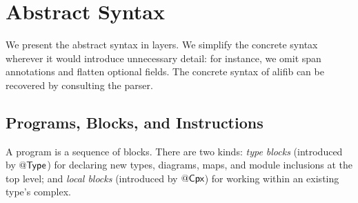 \documentclass[acmsmall,screen,nonacm]{acmart}
\begin{document}
\section{Abstract Syntax}
\label{sec:syntax}

We present the abstract syntax in layers. We simplify the concrete syntax
wherever it would introduce unnecessary detail: for instance, we omit span
annotations and flatten optional fields. The concrete syntax of
\textsf{alifib} can be recovered by consulting the parser.

\subsection{Programs, Blocks, and Instructions}
\label{sec:syntax:prog}

A program is a sequence of blocks. There are two kinds: \emph{type blocks}
(introduced by $\mathsf{@Type}$) for declaring new types, diagrams, maps, and
module inclusions at the top level; and \emph{local blocks} (introduced by
$\mathsf{@}\textsf{Cpx}$) for working within an existing type's complex.
\end{document}
